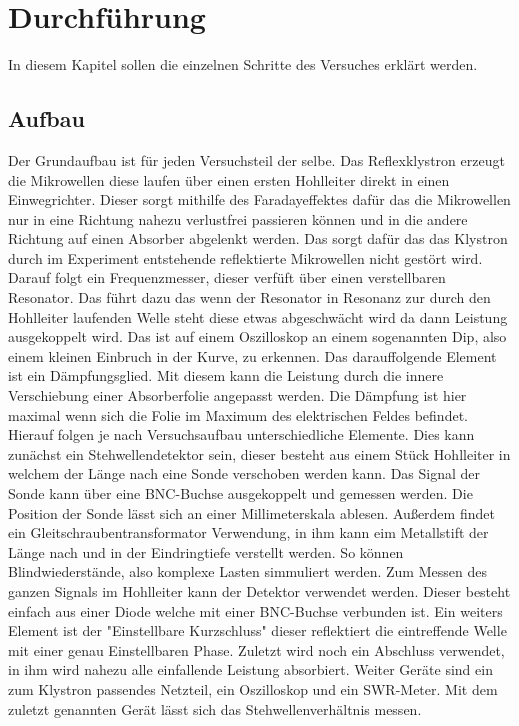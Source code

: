 \section{Durchführung}
\label{sec:Durchfuehrung}
In diesem Kapitel sollen die einzelnen Schritte des Versuches erklärt werden.

\subsection{Aufbau}
\label{sec:dfaufbau}
Der Grundaufbau ist für jeden Versuchsteil der selbe. Das Reflexklystron erzeugt die Mikrowellen
diese laufen über einen ersten Hohlleiter direkt in einen Einwegrichter. Dieser sorgt mithilfe des Faradayeffektes
dafür das die Mikrowellen nur in eine Richtung nahezu verlustfrei passieren können und in die andere Richtung 
auf einen Absorber abgelenkt werden. Das sorgt dafür das das Klystron durch im Experiment entstehende 
reflektierte Mikrowellen nicht gestört wird. Darauf folgt ein Frequenzmesser, dieser verfüft über einen 
verstellbaren Resonator. Das führt dazu das wenn der Resonator in Resonanz zur durch den Hohlleiter laufenden Welle
steht diese etwas abgeschwächt wird da dann Leistung ausgekoppelt wird. Das ist auf einem Oszilloskop an einem
sogenannten Dip, also einem kleinen Einbruch in der Kurve, zu erkennen. Das darauffolgende Element ist
ein Dämpfungsglied. Mit diesem kann die Leistung durch die innere Verschiebung einer Absorberfolie
angepasst werden. Die Dämpfung ist hier maximal wenn sich die Folie im Maximum des elektrischen Feldes 
befindet. Hierauf folgen je nach Versuchsaufbau unterschiedliche Elemente. Dies kann zunächst ein Stehwellendetektor
sein, dieser besteht aus einem Stück Hohlleiter in welchem der Länge nach eine Sonde verschoben werden kann. 
Das Signal der Sonde kann über eine BNC-Buchse ausgekoppelt und gemessen werden. Die Position der Sonde
lässt sich an einer Millimeterskala ablesen. Außerdem findet ein Gleitschraubentransformator Verwendung,
in ihm kann eim Metallstift der Länge nach und in der Eindringtiefe verstellt werden. So können
Blindwiederstände, also komplexe Lasten simmuliert werden. Zum Messen des ganzen Signals im Hohlleiter
kann der Detektor verwendet werden. Dieser besteht einfach aus einer Diode welche mit einer BNC-Buchse
verbunden ist. Ein weiters Element ist der "Einstellbare Kurzschluss" dieser 
reflektiert die eintreffende Welle mit einer genau Einstellbaren Phase. Zuletzt wird noch ein Abschluss
verwendet, in ihm wird nahezu alle einfallende Leistung absorbiert. Weiter Geräte sind ein zum Klystron passendes
Netzteil, ein Oszilloskop und ein SWR-Meter. Mit dem zuletzt genannten Gerät lässt sich das Stehwellenverhältnis
messen.

\subsection{}